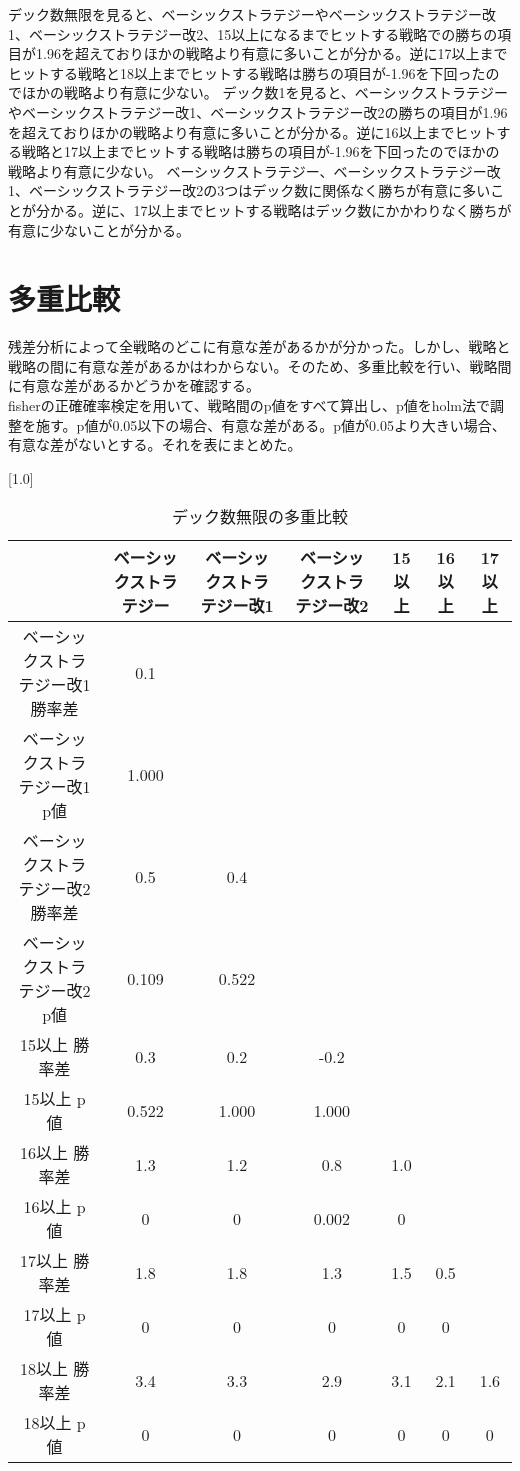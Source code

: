 デック数無限を見ると、ベーシックストラテジーやベーシックストラテジー改1、ベーシックストラテジー改2、15以上になるまでヒットする戦略での勝ちの項目が1.96を超えておりほかの戦略より有意に多いことが分かる。逆に17以上までヒットする戦略と18以上までヒットする戦略は勝ちの項目が-1.96を下回ったのでほかの戦略より有意に少ない。
デック数1を見ると、ベーシックストラテジーやベーシックストラテジー改1、ベーシックストラテジー改2の勝ちの項目が1.96を超えておりほかの戦略より有意に多いことが分かる。逆に16以上までヒットする戦略と17以上までヒットする戦略は勝ちの項目が-1.96を下回ったのでほかの戦略より有意に少ない。
ベーシックストラテジー、ベーシックストラテジー改1、ベーシックストラテジー改2の3つはデック数に関係なく勝ちが有意に多いことが分かる。逆に、17以上までヒットする戦略はデック数にかかわりなく勝ちが有意に少ないことが分かる。
\section{多重比較}
残差分析によって全戦略のどこに有意な差があるかが分かった。しかし、戦略と戦略の間に有意な差があるかはわからない。そのため、多重比較を行い、戦略間に有意な差があるかどうかを確認する。\\
fisherの正確確率検定を用いて、戦略間のp値をすべて算出し、p値をholm法で調整を施す。p値が0.05以下の場合、有意な差がある。p値が0.05より大きい場合、有意な差がないとする。それを表にまとめた。
\begin{table}[H]
 \begin{center}
 \small
 \scalebox{0.8}[1.0]{
  \begin{tabular}{|c|c|c|c|c|c|c|}
    \hline & ベーシックストラテジー & ベーシックストラテジー改1 & ベーシックストラテジー改2 & 15以上 & 16以上 & 17以上 \\
    \hline ベーシックストラテジー改1 勝率差 & 0.1 &  &  &  &  &   \\
    ベーシックストラテジー改1 p値 & 1.000 &  &  &  &  &    \\
    \hline ベーシックストラテジー改2 勝率差 & 0.5 & 0.4 & & & &  \\
    ベーシックストラテジー改2 p値 & 0.109 & 0.522 & & & &   \\
    \hline 15以上 勝率差 & 0.3 & 0.2 & -0.2 & & &   \\
    15以上 p値 & 0.522 & 1.000 & 1.000 & & &  \\
    \hline 16以上 勝率差 & 1.3 & 1.2 & 0.8 & 1.0 & &  \\
    16以上 p値 & 0 & 0 & 0.002 & 0 & &  \\
    \hline 17以上 勝率差 & 1.8 & 1.8 & 1.3 & 1.5 & 0.5 &  \\
    17以上 p値 & 0 & 0 & 0 & 0 & 0 & \\
    \hline 18以上 勝率差 & 3.4 & 3.3 & 2.9 & 3.1 & 2.1 & 1.6  \\
    18以上 p値 & 0 & 0 & 0 & 0 & 0 & 0  \\
    \hline
  \end{tabular}
 }
 \end{center}
 \caption{デック数無限の多重比較}
\end{table}
